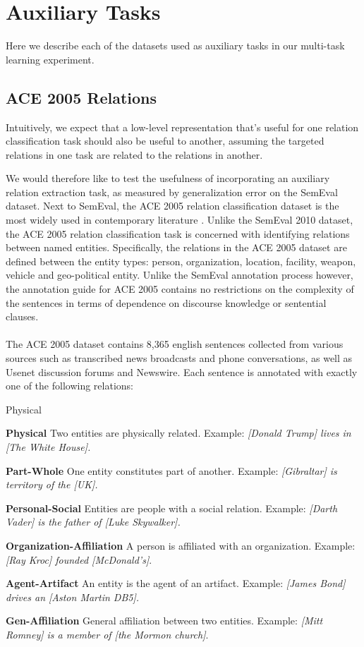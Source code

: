 \section{Auxiliary Tasks}
\label{auxiliary_tasks}
Here we describe each of the datasets used as auxiliary tasks in our multi-task learning experiment.
\subsection{ACE 2005 Relations}
Intuitively, we expect that a low-level representation that's useful for one relation classification task should also be useful to another, assuming the targeted relations in one task are related to the relations in another.

We would therefore like to test the usefulness of incorporating an auxiliary relation extraction task, as measured by generalization error on the SemEval dataset. Next to SemEval, the ACE 2005 relation classification dataset is the most widely used in contemporary literature  \citep{walker2006}. Unlike the SemEval 2010 dataset, the ACE 2005 relation classification task is concerned with identifying relations between named entities. Specifically, the relations in the ACE 2005 dataset are defined between the entity types: person, organization, location, facility, weapon, vehicle and geo-political entity. Unlike the SemEval annotation process however, the annotation guide for ACE 2005  contains no restrictions on the complexity of the sentences in terms of dependence on discourse knowledge or sentential clauses.
\\\\
The ACE 2005 dataset contains 8,365 english sentences collected from various sources such as transcribed news broadcasts and phone conversations, as well as Usenet discussion forums and Newswire. Each sentence is annotated with exactly one of the following relations:
\begin{labeling}{Physical}
	\item \textbf{Physical} Two entities are physically related. Example: \textit{[Donald Trump] lives in [The White House].}
	\item \textbf{Part-Whole} One entity constitutes part of another. Example: \textit{[Gibraltar] is territory of the [UK].}
	\item \textbf{Personal-Social} Entities are people with a social relation. Example: \textit{[Darth Vader] is the father of [Luke Skywalker].}
	\item \textbf{Organization-Affiliation} A person is affiliated with an organization. Example: \textit{[Ray Kroc] founded [McDonald's]}.
	\item \textbf{Agent-Artifact} An entity is the agent of an artifact. Example: \textit{[James Bond] drives an [Aston Martin DB5].}
	\item \textbf{Gen-Affiliation} General affiliation between two entities. Example: \textit{[Mitt Romney] is a member of [the Mormon church]}.
\end{labeling} 


